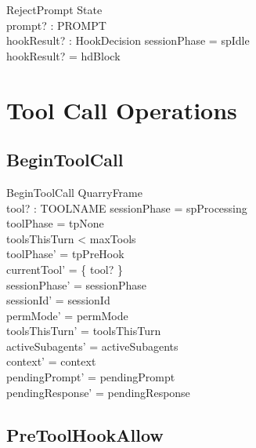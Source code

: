 \documentclass[a4paper,10pt,fleqn]{article}
\begin{document}
\begin{schema}{RejectPrompt}
  \Xi State \\
  prompt? : PROMPT \\
  hookResult? : HookDecision
  \where
  sessionPhase = spIdle \\
  hookResult? = hdBlock
\end{schema}

\section{Tool Call Operations}

\subsection{BeginToolCall}

\begin{schema}{BeginToolCall}
  QuarryFrame \\
  tool? : TOOLNAME
  \where
  sessionPhase = spProcessing \\
  toolPhase = tpNone \\
  toolsThisTurn < maxTools \\
  toolPhase' = tpPreHook \\
  currentTool' = \{ tool? \} \\
  sessionPhase' = sessionPhase \\
  sessionId' = sessionId \\
  permMode' = permMode \\
  toolsThisTurn' = toolsThisTurn \\
  activeSubagents' = activeSubagents \\
  context' = context \\
  pendingPrompt' = pendingPrompt \\
  pendingResponse' = pendingResponse
\end{schema}

\subsection{PreToolHookAllow}
\end{document}
